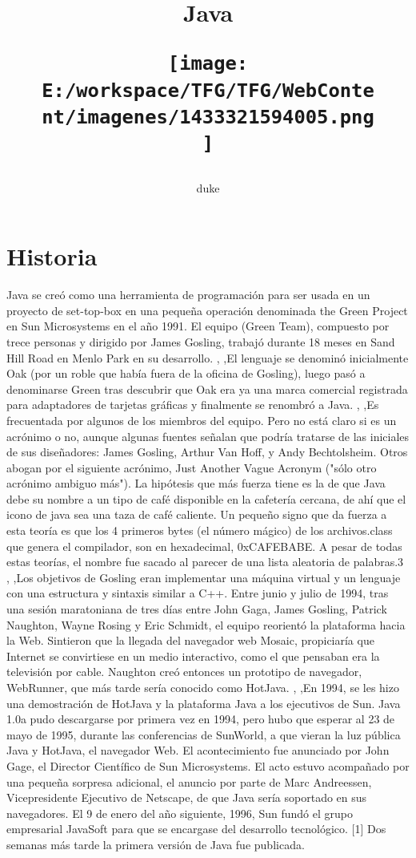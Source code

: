 \documentclass[11pt,a4paper]{$type}
\title{\Huge{\textbf{Java}}
\begin{figure}[hbtp]
		\centering
		\texttt{[image: E:/workspace/TFG/TFG/WebContent/imagenes/1433321594005.png]}
	\end{figure}}
\author{duke}
\begin{document}
\maketitle

\tableofcontents


			\chapter{Historia}
												Java se creó como una herramienta de programación para ser usada en un proyecto de set-top-box en una pequeña operación denominada the Green Project en Sun Microsystems en el año 1991. El equipo (Green Team), compuesto por trece personas y dirigido por James Gosling, trabajó durante 18 meses en Sand Hill Road en Menlo Park en su desarrollo.
	\bigskip
							,
	\bigskip
							,El lenguaje se denominó inicialmente Oak (por un roble que había fuera de la oficina de Gosling), luego pasó a denominarse Green tras descubrir que Oak era ya una marca comercial registrada para adaptadores de tarjetas gráficas y finalmente se renombró a Java.
	\bigskip
							,
	\bigskip
							,Es frecuentada por algunos de los miembros del equipo. Pero no está claro si es un acrónimo o no, aunque algunas fuentes señalan que podría tratarse de las iniciales de sus diseñadores: James Gosling, Arthur Van Hoff, y Andy Bechtolsheim. Otros abogan por el siguiente acrónimo, Just Another Vague Acronym ("sólo otro acrónimo ambiguo más"). La hipótesis que más fuerza tiene es la de que Java debe su nombre a un tipo de café disponible en la cafetería cercana, de ahí que el icono de java sea una taza de café caliente. Un pequeño signo que da fuerza a esta teoría es que los 4 primeros bytes (el número mágico) de los archivos.class que genera el compilador, son en hexadecimal, 0xCAFEBABE. A pesar de todas estas teorías, el nombre fue sacado al parecer de una lista aleatoria de palabras.3
	\bigskip
							,
	\bigskip
							,Los objetivos de Gosling eran implementar una máquina virtual y un lenguaje con una estructura y sintaxis similar a C++. Entre junio y julio de 1994, tras una sesión maratoniana de tres días entre John Gaga, James Gosling, Patrick Naughton, Wayne Rosing y Eric Schmidt, el equipo reorientó la plataforma hacia la Web. Sintieron que la llegada del navegador web Mosaic, propiciaría que Internet se convirtiese en un medio interactivo, como el que pensaban era la televisión por cable. Naughton creó entonces un prototipo de navegador, WebRunner, que más tarde sería conocido como HotJava.
	\bigskip
							,
	\bigskip
							,En 1994, se les hizo una demostración de HotJava y la plataforma Java a los ejecutivos de Sun. Java 1.0a pudo descargarse por primera vez en 1994, pero hubo que esperar al 23 de mayo de 1995, durante las conferencias de SunWorld, a que vieran la luz pública Java y HotJava, el navegador Web. El acontecimiento fue anunciado por John Gage, el Director Científico de Sun Microsystems. El acto estuvo acompañado por una pequeña sorpresa adicional, el anuncio por parte de Marc Andreessen, Vicepresidente Ejecutivo de Netscape, de que Java sería soportado en sus navegadores. El 9 de enero del año siguiente, 1996, Sun fundó el grupo empresarial JavaSoft para que se encargase del desarrollo tecnológico. [1] Dos semanas más tarde la primera versión de Java fue publicada.
\end{document}
